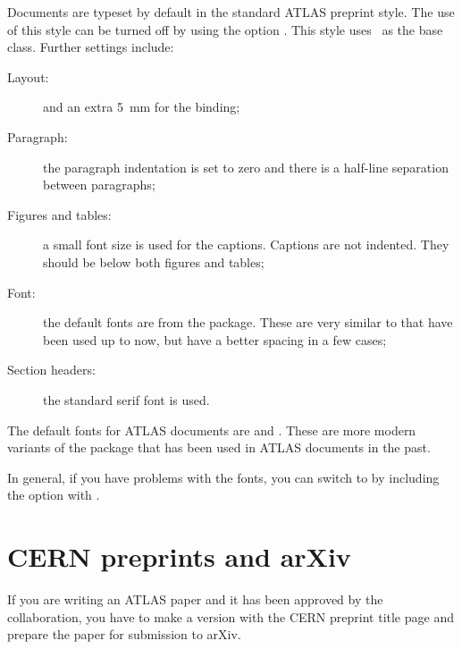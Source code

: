 Documents are typeset by default in the standard ATLAS preprint style.
The use of this style can be turned off by using the option
.
This style uses \KOMAScript\ as the base class.
Further settings include:
\begin{description}
\item[Layout:]  and an extra \SI{5}{\mm} for the binding;
\item[Paragraph:] the paragraph indentation is set to zero and 
  there is a half-line separation between paragraphs;
\item[Figures and tables:] a small font size is used for the captions.
  Captions are not indented.
  They should be below both figures and tables;
\item[Font:] the default fonts are from the  package.
  These are very similar to  that have been used up to now,
  but have a better spacing in a few cases;
\item[Section headers:] the standard serif font is used.
\end{description}

The default fonts for ATLAS documents are  and .
These are more modern variants of the package  that has been used in
ATLAS documents in the past.

In general, if you have problems with the  fonts,
you can switch to  by including the option  with .


\section{CERN preprints and arXiv}
\label{sec:preprint}

If you are writing an ATLAS paper and it has been approved by the collaboration,
you have to make a version with the CERN preprint title page and prepare the 
paper for submission to arXiv.

